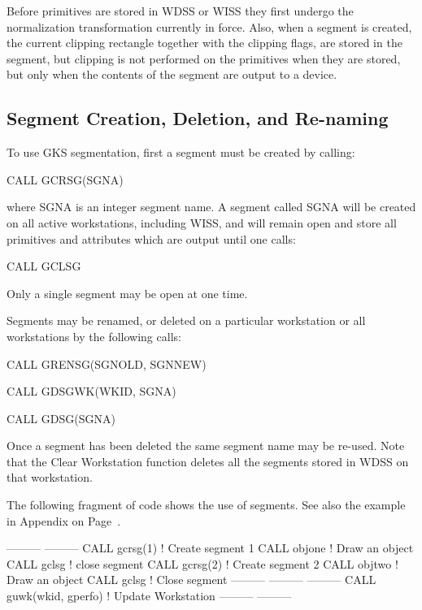 Before primitives are stored in WDSS or WISS they first undergo
the normalization transformation currently in force.
Also, when a segment is created, the current clipping rectangle
together with the clipping flags, are stored in the segment,
but clipping is not performed
on the primitives when they are stored, but only when the
contents of the segment are output to a device.
\subsection{Segment Creation, Deletion, and Re-naming}
 
To use GKS segmentation, first a segment must be created by calling:
\begin{XMP}
CALL GCRSG(SGNA)
\end{XMP}
where SGNA is an integer segment name. A segment called SGNA will
be created on all active workstations, including WISS, and will remain
open and store all primitives and attributes which are output until one calls:
\begin{XMP}
CALL GCLSG
\end{XMP}
Only a single segment may be open at one time.
 
Segments may be renamed, or deleted on a particular workstation
or all workstations by the following calls:
\begin{XMP}
CALL GRENSG(SGNOLD, SGNNEW)
 
CALL GDSGWK(WKID, SGNA)
 
CALL GDSG(SGNA)
\end{XMP}
Once a segment has been deleted the same segment name may be re-used.
Note that the Clear Workstation function deletes all the segments
stored in WDSS on that workstation.
 
The following fragment of code shows the use of segments.
See also the example in Appendix on Page~\pageref{sec:ex3dv}.
\begin{XMP}
      ---------
      ---------
      CALL gcrsg(1)                   ! Create segment 1
      CALL objone                     ! Draw an object
      CALL gclsg                      ! close segment
      CALL gcrsg(2)                   ! Create segment 2
      CALL objtwo                     ! Draw an object
      CALL gclsg                      ! Close segment
      ---------
      ---------
      ---------
      CALL guwk(wkid, gperfo)         ! Update Workstation
      ---------
      ---------
\end{XMP}
